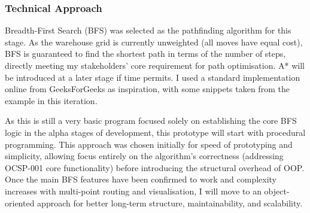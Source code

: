 \subsubsection{Technical Approach}

Breadth-First Search (BFS) was selected as the pathfinding algorithm for this stage. As the warehouse grid is currently unweighted (all moves have equal cost), BFS is guaranteed to find the shortest path in terms of the number of steps, directly meeting my stakeholders' core requirement for path optimisation. A* will be introduced at a later stage if time permits. I used a standard implementation online from GeeksForGeeks as inspiration, with some snippets taken from the example in this iteration.

As this is still a very basic program focused solely on establishing the core BFS logic in the alpha stages of development, this prototype will start with procedural programming. This approach was chosen initially for speed of prototyping and simplicity, allowing focus entirely on the algorithm's correctness (addressing OCSP-001 core functionality) before introducing the structural overhead of OOP. Once the main BFS features have been confirmed to work and complexity increases with multi-point routing and visualisation, I will move to an object-oriented approach for better long-term structure, maintainability, and scalability.
